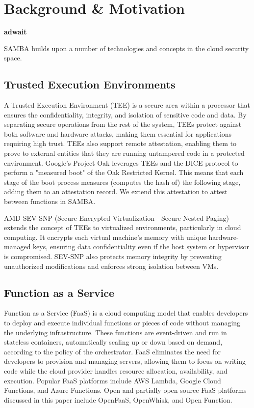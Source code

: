 \section{Background \& Motivation}
\label{sec:background}

\textbf{adwait}

SAMBA builds upon a number of technologies and concepts in the cloud security space.

\subsection{Trusted Execution Environments}
A Trusted Execution Environment (TEE) is a secure area within a processor that ensures the confidentiality, integrity, and isolation of sensitive code and data.
By separating secure operations from the rest of the system, TEEs protect against both software and hardware attacks, making them essential for applications requiring high trust. 
TEEs also support remote attestation, enabling them to prove to external entities that they are running untampered code in a protected environment.
Google's Project Oak leverages TEEs and the DICE protocol to perform a "measured boot" of the Oak Restricted Kernel.
This means that each stage of the boot process measures (computes the hash of) the following stage, adding them to an attestation record.
We extend this attestation to attest between functions in SAMBA.

AMD SEV-SNP (Secure Encrypted Virtualization - Secure Nested Paging) extends the concept of TEEs to virtualized environments, particularly in cloud computing.
It encrypts each virtual machine's memory with unique hardware-managed keys, ensuring data confidentiality even if the host system or hypervisor is compromised.
SEV-SNP also protects memory integrity by preventing unauthorized modifications and enforces strong isolation between VMs.

\subsection{Function as a Service}
Function as a Service (FaaS) is a cloud computing model that enables developers to deploy and execute individual functions or pieces of code without managing the underlying infrastructure.
These functions are event-driven and run in stateless containers, automatically scaling up or down based on demand, according to the policy of the orchestrator.
FaaS eliminates the need for developers to provision and managing servers, allowing them to focus on writing code while the cloud provider handles resource allocation, availability, and execution.
Popular FaaS platforms include AWS Lambda, Google Cloud Functions, and Azure Functions.
Open and partially open source FaaS platforms discussed in this paper include OpenFaaS, OpenWhisk, and Open Function.

